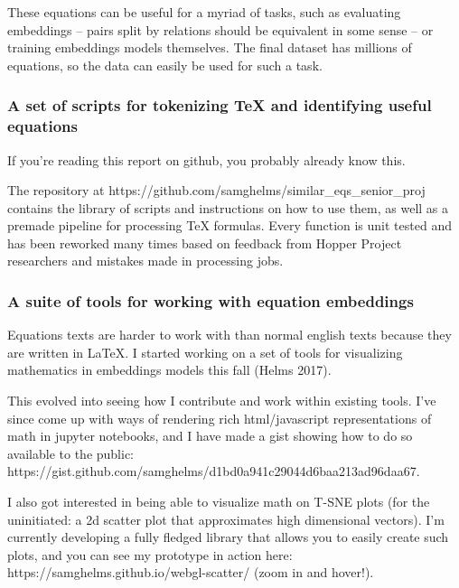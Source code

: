 \documentclass[]{article}
\begin{document}
These equations can be useful for a myriad of tasks, such as evaluating
embeddings -- pairs split by relations should be equivalent in some
sense -- or training embeddings models themselves. The final dataset has
millions of equations, so the data can easily be used for such a task.

\hypertarget{a-set-of-scripts-for-tokenizing-tex-and-identifying-useful-equations}{%
\subsubsection{A set of scripts for tokenizing TeX and identifying
useful
equations}\label{a-set-of-scripts-for-tokenizing-tex-and-identifying-useful-equations}}

If you're reading this report on github, you probably already know this.

The repository at
https://github.com/samghelms/similar\_eqs\_senior\_proj contains the
library of scripts and instructions on how to use them, as well as a
premade pipeline for processing TeX formulas. Every function is unit
tested and has been reworked many times based on feedback from Hopper
Project researchers and mistakes made in processing jobs.

\hypertarget{a-suite-of-tools-for-working-with-equation-embeddings}{%
\subsubsection{A suite of tools for working with equation
embeddings}\label{a-suite-of-tools-for-working-with-equation-embeddings}}

Equations texts are harder to work with than normal english texts
because they are written in LaTeX. I started working on a set of tools
for visualizing mathematics in embeddings models this fall (Helms 2017).

This evolved into seeing how I contribute and work within existing
tools. I've since come up with ways of rendering rich html/javascript
representations of math in jupyter notebooks, and I have made a gist
showing how to do so available to the public:
https://gist.github.com/samghelms/d1bd0a941c29044d6baa213ad96daa67.

I also got interested in being able to visualize math on T-SNE plots
(for the uninitiated: a 2d scatter plot that approximates high
dimensional vectors). I'm currently developing a fully fledged library
that allows you to easily create such plots, and you can see my
prototype in action here: https://samghelms.github.io/webgl-scatter/
(zoom in and hover!).
\end{document}
